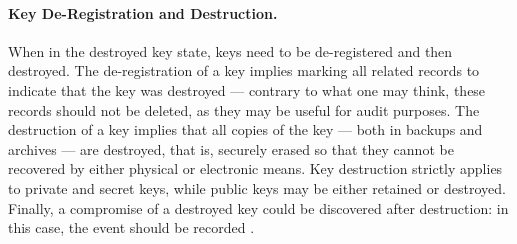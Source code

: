 \paragraph*{Key De-Registration and Destruction.} When in the destroyed key state, keys need to be de-registered and then destroyed. The de-registration of a key implies marking all related records to indicate that the key was destroyed --- contrary to what one may think, these records should not be deleted, as they may be useful for audit purposes. The destruction of a key implies that all copies of the key --- both in backups and archives --- are destroyed, that is, securely erased so that they cannot be recovered by either physical or electronic means. Key destruction strictly applies to private and secret keys, while public keys may be either retained or destroyed. Finally, a compromise of a destroyed key could be discovered after destruction: in this case, the event should be recorded \cite{barker_profile_2015}.

